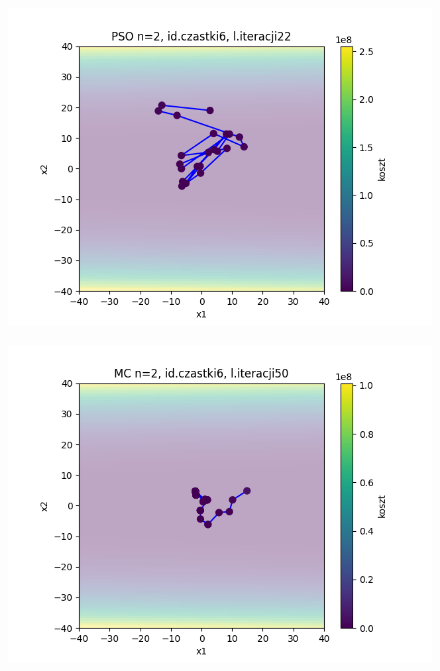 \documentclass[11pt, a4paper, oneside]{article}
\begin{document}
\begin{figure}[H]
\centering
\begin{minipage}[b]{\dimexpr.5\textwidth-1em}
  \centering
  \includegraphics[width=1\linewidth]{grafiki/Wykresy2d/Zad2_PSO_plot_6.png}
  \label{fig:trajektoriaWybrana:PSO2}
\end{minipage} \hfill
\begin{minipage}[b]{\dimexpr.5\textwidth-1em}
  \centering
  \includegraphics[width=1\linewidth]{grafiki/Wykresy2d/Zad2_MC_plot_6.png}
  \label{fig:trajektoriaWybrana:MC2}
\end{minipage}
\end{figure}
\end{document}
